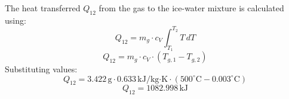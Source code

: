 The heat transferred \( Q_{12} \) from the gas to the ice-water mixture is calculated using:  
\[
Q_{12} = m_g \cdot c_V \int_{T_1}^{T_2} T \, dT
\]  
\[
Q_{12} = m_g \cdot c_V \cdot (T_{g,1} - T_{g,2})
\]  
Substituting values:  
\[
Q_{12} = 3.422 \, \text{g} \cdot 0.633 \, \text{kJ/kg·K} \cdot (500^\circ\text{C} - 0.003^\circ\text{C})
\]  
\[
Q_{12} = 1082.998 \, \text{kJ}
\]